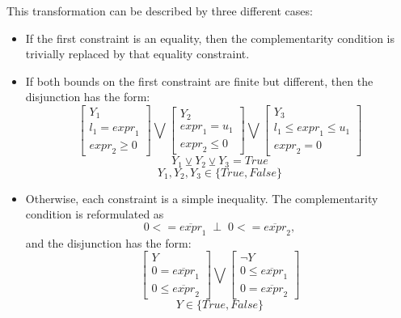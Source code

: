 This transformation can be described by
three different cases:
\begin{itemize}

\item If the first constraint is an equality, then the complementarity condition is trivially replaced by that equality constraint.

\item If both bounds on the first constraint are finite but different, then the disjunction has the form:
\[
\left[\begin{array}{c}
Y_1\\
l_1 = {expr}_1\\
{expr}_2 \geq 0
\end{array}\right]
\bigvee
\left[\begin{array}{c}
Y_2\\
{expr}_1 = u_1\\
{expr}_2 \leq 0
\end{array}\right]
\bigvee
\left[\begin{array}{c}
Y_3\\
l_1 \leq {expr}_1 \leq u_1\\
{expr}_2 = 0
\end{array}\right]
\]\[
Y_1 \veebar Y_2 \veebar Y_3 = True
\]
\[
Y_1, Y_2, Y_3 \in \{True, False\}
\]

\item Otherwise, each constraint is a simple inequality.  The complementarity condition is reformulated as
\[
0 <= \overline{expr}_1  \;\;\bot\;\; 0 <= \overline{expr}_2,
\]
and the disjunction has the form:
\[
\left[\begin{array}{c}
Y\\
0 = \overline{expr}_1\\
0 \leq \overline{expr}_2
\end{array}\right]
\bigvee
\left[\begin{array}{c}
\lnot Y\\
0 \leq \overline{expr}_1\\
0 = \overline{expr}_2
\end{array}\right]
\]\[
Y \in \{ True, False \}
\]

\end{itemize}

